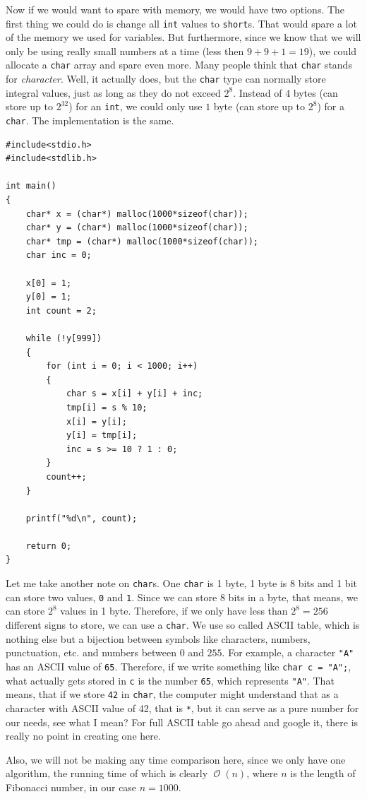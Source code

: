 \documentclass{book}
\DeclareMathOperator{\bigo}{\mathcal{O}}
\begin{document}
Now if we would want to spare with memory, we would have two options. The first thing we could do is change all \texttt{int} values to \texttt{short}s. That would spare a lot of the memory we used for variables. But furthermore, since we know that we will only be using really small numbers at a time (less then $9+9+1 = 19$), we could allocate a \texttt{char} array and spare even more. Many people think that \texttt{char} stands for \textit{character}. Well, it actually does, but the \texttt{char} type can normally store integral values, just as long as they do not exceed $2^8$. Instead of $4$ bytes (can store up to $2^{32}$) for an \texttt{int}, we could only use $1$ byte (can store up to $2^8$) for a \texttt{char}. The implementation is the same.

\begin{verbatim}
#include<stdio.h>
#include<stdlib.h>

int main()
{
    char* x = (char*) malloc(1000*sizeof(char));
    char* y = (char*) malloc(1000*sizeof(char));
    char* tmp = (char*) malloc(1000*sizeof(char));
    char inc = 0;

    x[0] = 1;
    y[0] = 1;
    int count = 2;

    while (!y[999])
    {
        for (int i = 0; i < 1000; i++)
        {
            char s = x[i] + y[i] + inc;
            tmp[i] = s % 10;
            x[i] = y[i];
            y[i] = tmp[i];
            inc = s >= 10 ? 1 : 0;
        }
        count++;
    }

    printf("%d\n", count);

    return 0;
}
\end{verbatim}

Let me take another note on \texttt{char}s. One \texttt{char} is 1 byte, 1 byte is 8 bits and 1 bit can store two values, \texttt{0} and \texttt{1}. Since we can store 8 bits in a byte, that means, we can store $2^8$ values in 1 byte. Therefore, if we only have less than $2^8 = 256$ different signs to store, we can use a \texttt{char}. We use so called ASCII table, which is nothing else but a bijection between symbols like characters, numbers, punctuation, etc. and numbers between $0$ and $255$. For example, a character \texttt{"A"} has an ASCII value of \texttt{65}. Therefore, if we write something like \texttt{char c = "A";}, what actually gets stored in \texttt{c} is the number \texttt{65}, which represents \texttt{"A"}. That means, that if we store \texttt{42} in \texttt{char}, the computer might understand that as a character with ASCII value of 42, that is \texttt{*}, but it can serve as a pure number for our needs, see what I mean? For full ASCII table go ahead and google it, there is really no point in creating one here.

Also, we will not be making any time comparison here, since we only have one algorithm, the running time of which is clearly $\bigo(n)$, where $n$ is the length of Fibonacci number, in our case $n = 1000$.
\end{document}
